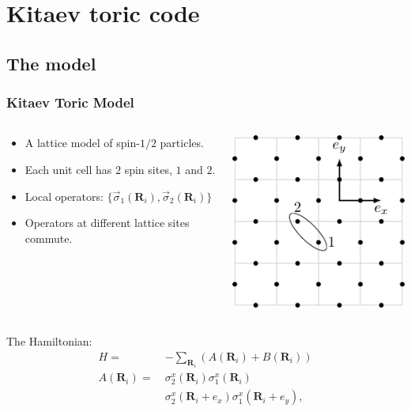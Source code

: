 \documentclass{beamer}
\renewcommand{\(}{\left(}
\renewcommand{\)}{\right)}
\renewcommand{\[}{\left[}
\renewcommand{\]}{\right]}
\begin{document}
\section{Kitaev toric code}
\subsection{The model}
\begin{frame}
    \frametitle{Kitaev Toric Model}
    \begin{columns}
        \begin{column}{0.67\textwidth}
            \begin{itemize}
                \item A lattice model of spin-$1/2$ particles.
                \item Each unit cell has $2$ spin sites, $1$ and $2$.
                \item Local operators: $\{\vec{\sigma}_{1}(\bm R_i), \vec{\sigma}_{2}(\bm R_i)\}$
                \item Operators at different lattice sites commute.
            \end{itemize} 
        \end{column}
        \begin{column}{0.33\textwidth}
            \centering
            \includegraphics[scale=0.8]{spin_grid.pdf}
        \end{column}
    \end{columns}
    \pause
    \vspace{8pt}
    \begin{columns}
        \begin{column}{0.62\textwidth}
            The Hamiltonian: 
                \begin{align*}
                    H =& -\sum_{\bm R_i} \(A(\bm R_i)  + B(\bm R_i) \)\\
                    A(\bm R_i) = \ &\sigma^x_{2}(\bm R_i)\sigma^x_{1}(\bm R_i) \\  & \sigma^x_{2}  (\bm R_i + e_x)\sigma^x_{1} (\bm R_i+ e_y), \\

\end{align*}
\end{column}
\end{columns}
\end{frame}
\end{document}
